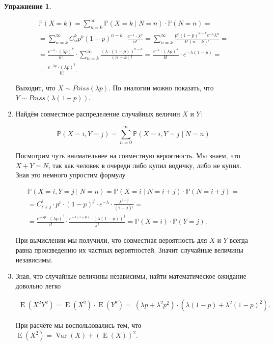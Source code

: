 \documentclass[12pt, a4paper, oneside]{extreport}
\DeclareMathOperator{\Var}{Var}
\DeclareMathOperator{\E}{\mathop{E}}
\def \mbb{\mathbb}
\def \PP{\mbb{P}}
\theoremstyle{plain}              %
\theoremstyle{definition}         %
\newtheorem{problem}{\color{myblue} Упражнение}
\begin{document}
\begin{problem}
\begin{sol}
\begin{enumerate}
\begin{multline*}
		\PP(X = k) = \sum_{n=0}^{\infty} \PP(X = k \mid N =n) \cdot \PP(N = n) = \\ = \sum_{n = k}^{\infty} C_n^k p^k (1-p)^{n-k} \cdot \frac{e^{-\lambda} \cdot \lambda^n}{n!} = \sum_{n = k}^{\infty} \frac{p^k (1-p)^{n-k} e^{-\lambda} \lambda^n }{k! (n-k)!} = \\ = \frac{e^{-\lambda} \cdot (\lambda p)^k}{k!} \cdot  \sum_{n = k}^{\infty} \frac{(\lambda \cdot (1-p))^{n-k}}{(n-k)!}  = \frac{e^{-\lambda} \cdot (\lambda p)^k}{k!} \cdot e^{-\lambda (1-p)} = \\ = \frac{e^{-\lambda p} \cdot (\lambda p)^k}{k!}.
\end{multline*}

Выходит, что $X \sim Poiss(\lambda p)$. По аналогии можно показать, что $Y \sim Poiss(\lambda (1-p))$.
	
	\item Найдём совместное распределение случайных величин $X$ и $Y$: 
	
\[
	\PP(X = i, Y = j) = \sum_{n=0}^{\infty} \PP(X = i, Y = j \mid N=n)
\]	

Посмотрим чуть внимательнее на совместную вероятность. Мы знаем, что $X + Y = N$, так как человек в очереди либо купил водичку, либо не купил. Зная это немного упростим формулу

\begin{multline*}
	\PP(X = i, Y =j \mid N = n) = \PP(X =i \mid N = i + j) \cdot \PP(N = i + j)  = \\ = C_{i+j}^{i} \cdot p^i \cdot (1-p)^{j} \cdot e^{-\lambda} \cdot \frac{\lambda^{i + j}}{(i + j)!} =\\= \frac{e^{-\lambda p} \cdot (\lambda p)^i}{i!} \cdot \frac{e^{-\lambda (1-p) } \cdot (\lambda (1-p))^j}{j!} = \PP(X = i) \cdot \PP(Y = j).
\end{multline*}

При вычислении мы получили, что совместная вероятность для $X$ и $Y$ всегда равна произведению их частных вероятностей. Значит случайные величины независимы. 
	
	\item  Зная, что случайные величины независимы, найти математическое ожидание довольно легко
	
	\begin{multline*}
	\E(X^2 Y^2) = \E(X^2) \cdot \E(Y^2) = \ (\lambda p + \lambda^2 p^2) \cdot (\lambda (1-p) + \lambda^2 (1-p)^2). 
	\end{multline*}
	
	При расчёте мы воспользовались тем, что $\E(X^2) = \Var(X) + (\E(X))^2$. 
	
\end{enumerate}
\end{sol} 
\end{problem}
\end{document}
